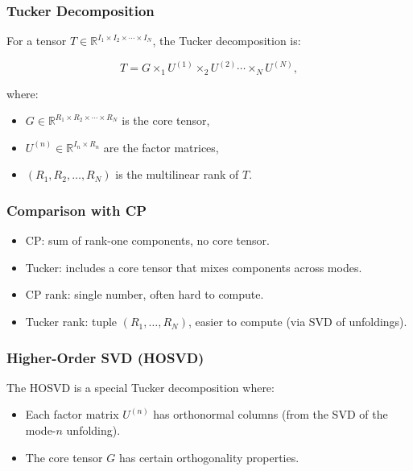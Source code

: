 \documentclass[
  letterpaper,
  DIV=11,
  numbers=noendperiod]{scrreprt}
\providecommand{\tightlist}{%
  \setlength{\itemsep}{0pt}\setlength{\parskip}{0pt}}
\begin{document}
\subsubsection{Tucker Decomposition}\label{tucker-decomposition-1}

For a tensor
\(T \in \mathbb{R}^{I_1 \times I_2 \times \cdots \times I_N}\), the
Tucker decomposition is:

\[
T = G \times_1 U^{(1)} \times_2 U^{(2)} \cdots \times_N U^{(N)},
\]

where:

\begin{itemize}
\tightlist
\item
  \(G \in \mathbb{R}^{R_1 \times R_2 \times \cdots \times R_N}\) is the
  core tensor,
\item
  \(U^{(n)} \in \mathbb{R}^{I_n \times R_n}\) are the factor matrices,
\item
  \((R_1, R_2, \dots, R_N)\) is the multilinear rank of \(T\).
\end{itemize}

\subsubsection{Comparison with CP}\label{comparison-with-cp}

\begin{itemize}
\tightlist
\item
  CP: sum of rank-one components, no core tensor.
\item
  Tucker: includes a core tensor that mixes components across modes.
\item
  CP rank: single number, often hard to compute.
\item
  Tucker rank: tuple \((R_1,\dots,R_N)\), easier to compute (via SVD of
  unfoldings).
\end{itemize}

\subsubsection{Higher-Order SVD (HOSVD)}\label{higher-order-svd-hosvd}

The HOSVD is a special Tucker decomposition where:

\begin{itemize}
\tightlist
\item
  Each factor matrix \(U^{(n)}\) has orthonormal columns (from the SVD
  of the mode-\(n\) unfolding).
\item
  The core tensor \(G\) has certain orthogonality properties.
\end{itemize}
\end{document}
